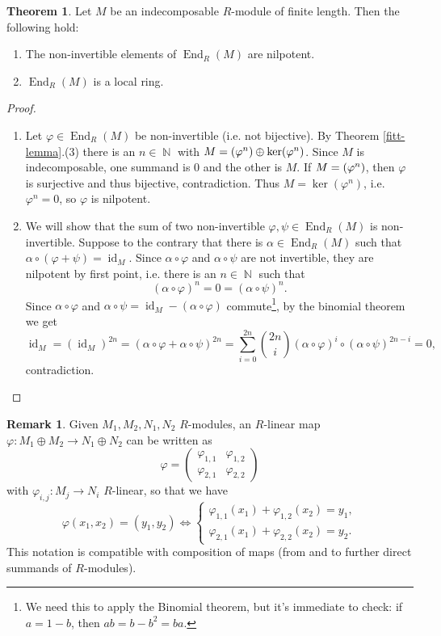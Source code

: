 \documentclass[12pt,a4paper]{report}
\theoremstyle{definition}
\newtheorem{theorem}{Theorem}[chapter] %
\newtheorem*{remark}{Remark}
\theoremstyle{num.custom-title}
\DeclareMathOperator{\id}{id}
\let\o\relax %
\DeclareMathOperator{\o}{\mathsf{o}}
\let\Im\relax %
\DeclareMathOperator{\Im}{Im}
\DeclareMathOperator{\End}{End}
\DeclareMathOperator{\N}{\mathbb{N}}
\newcommand{\IFF}{\Longleftrightarrow}
\renewcommand{\phi}{\varphi}
\begin{document}
\begin{theorem}\label{thm_fin-length_local-ring-end}
Let $M$ be an indecomposable $R$-module of finite length. Then the following hold:
\begin{enumerate}
\item The non-invertible elements of $\End_R(M)$ are nilpotent.
\item $\End_R(M)$ is a local ring.
\end{enumerate}
\begin{proof}\ 
\begin{enumerate}
\item Let $\phi \in \End_R(M)$ be non-invertible (i.e. not bijective). By Theorem \ref{fitt-lemma}.(3) there is an $n \in \N$ with $M=\Im(\phi^n) \oplus \ker(\phi^n)$. Since $M$ is indecomposable, one summand is $0$ and the other is $M$. If $M=\Im(\phi^n)$, then $\phi$ is surjective and thus bijective, contradiction. Thus $M=\ker(\phi^n)$, i.e. $\phi^n=0$, so $\phi$ is nilpotent.
\item We will show that the sum of two non-invertible $\phi,\psi \in \End_R(M)$ is non-invertible. Suppose to the contrary that there is $\alpha \in \End_R(M)$ such that $\alpha \circ (\phi+\psi)=\id_M$. Since $\alpha \circ \phi$ and $\alpha \circ \psi$ are not invertible, they are nilpotent by first point, i.e. there is an $n \in \N$ such that
\[
(\alpha \circ \phi)^n = 0 = (\alpha \circ \psi)^n.
\]
Since $\alpha \circ \phi$ and $\alpha \circ \psi = \id_M-(\alpha \circ \phi)$ commute\footnote{We need this to apply the Binomial theorem, but it's immediate to check: if $a=1-b$, then $ab=b-b^2=ba$.}, by the binomial theorem we get
\[
\id_M = (\id_M)^{2n} = (\alpha \circ \phi + \alpha \circ \psi)^{2n} = \sum_{i=0}^{2n} \binom{2n}{i} (\alpha \circ \phi)^i \circ (\alpha \circ \psi)^{2n-i} = 0,
\]
contradiction.
\end{enumerate}
\end{proof}
\end{theorem}

\begin{remark}
Given $M_1,M_2,N_1,N_2$ $R$-modules, an $R$-linear map $\phi : M_1 \oplus M_2 \to N_1 \oplus N_2$ can be written as
\[
\phi = 
\begin{pmatrix}
\phi_{1,1} & \phi_{1,2} \\
\phi_{2,1} & \phi_{2,2}
\end{pmatrix}
\]
with $\phi_{i,j} : M_j \to N_i$ $R$-linear, so that we have
\[
\phi(x_1,x_2) = (y_1,y_2) \IFF 
\begin{cases}
\phi_{1,1}(x_1) + \phi_{1,2}(x_2) = y_1, \\
\phi_{2,1}(x_1) + \phi_{2,2}(x_2) = y_2.
\end{cases}
\]
This notation is compatible with composition of maps (from and to further direct summands of $R$-modules).
\end{remark}
\end{document}
